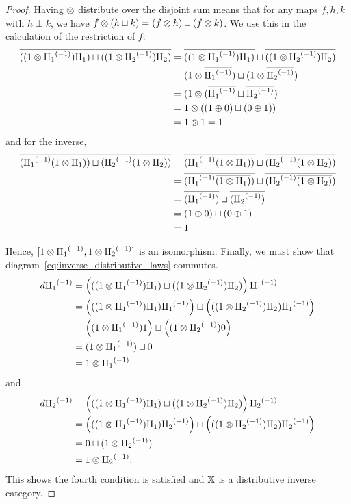 \begin{proof}
  Having $\*$ distribute over the disjoint sum means that for any maps $f,h,k$ with $h\perp k$, we
  have $f \* (h\djoin k) = (f\*h) \djoin (f\*k)$. We use this in the calculation of the restriction
  of $f$:
  \begin{align*}
    \rst{((1 \* \icpa) \cpa )\djoin ((1\*\icpb) \cpb)}
      &= \rst{((1 \* \icpa) \cpa )}\djoin \rst{((1\*\icpb) \cpb)} \\
      &= (1\* \rst{\icpa}) \djoin (1\* \rst{\icpb}) \\
      &= (1\* (\rst{\icpa} \djoin \rst{\icpb}) \\
      &= 1\* ((1\+0) \djoin (0\+1) )\\
      &=1 \* 1 = 1
  \end{align*}
  and for the inverse,
  \begin{align*}
    \rst{( \icpa(1 \* \cpa) ) \djoin ( \icpb(1\*\cpb))}
      &= \rst{(\icpa(1 \* \cpa) )}\djoin \rst{(\icpb(1\*\cpb))} \\
      &= \rst{(\icpa\rst{(1 \* \cpa)} )}\djoin \rst{(\icpb\rst{(1\*\cpb)})} \\
      &= \rst{(\icpa)}\djoin \rst{(\icpb)}\\
      &= (1\+0) \djoin (0\+1) \\
      &= 1
  \end{align*}

  Hence, $[1\* \icpa, 1\* \icpb]$ is an isomorphism.
  Finally, we must show that diagram~\ref{eq:inverse_distributive_laws} commutes.
  \begin{align*}
    d \icpa & = \left( ((1 \* \icpa) \cpa )\djoin ((1\*\icpb) \cpb) \right)\icpa \\
     & = \left(((1 \* \icpa) \cpa )\icpa \right) \djoin \left( ((1\*\icpb) \cpb) \icpa\right) \\
     & = \left((1 \* \icpa) 1 \right) \djoin \left( (1\*\icpb) 0\right) \\
     & = (1 \* \icpa) \djoin 0\\
     & = 1 \* \icpa
  \end{align*}
  and
  \begin{align*}
    d \icpb & = \left( ((1 \* \icpa) \cpa )\djoin ((1\*\icpb) \cpb) \right)\icpb \\
     & = \left(((1 \* \icpa) \cpa )\icpb \right) \djoin \left( ((1\*\icpb) \cpb) \icpb\right) \\
     & = 0 \djoin (1 \* \icpb)\\
     & = 1 \* \icpb.
  \end{align*}
  This shows the fourth condition is satisfied and $\X$ is a distributive inverse category.
\end{proof}

